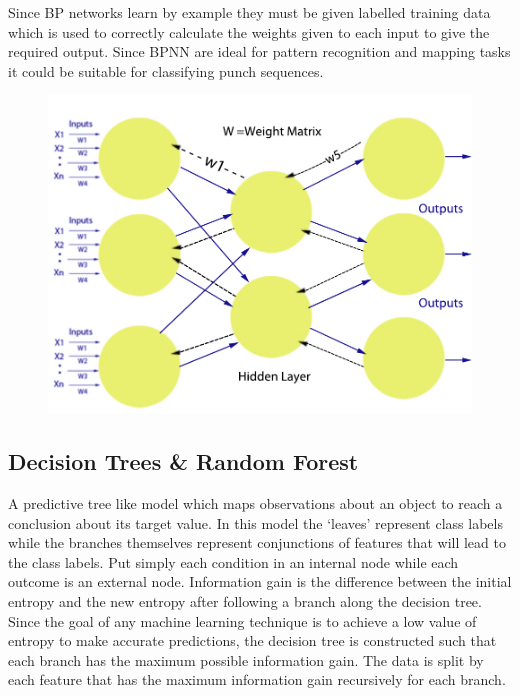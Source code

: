Since BP networks learn by example they must be given labelled training data which is used to correctly calculate the weights given to each input to give the required output. Since BPNN are ideal for pattern recognition and mapping tasks it could be suitable for classifying punch sequences.

\begin{figure}[h]
    \centering
    \includegraphics[height=0.25\textheight]{fig02/nn.pdf}
    \label{fig:kinect}
\end{figure}


\subsection{Decision Trees \& Random Forest}
A predictive tree like model which maps observations about an object to reach a conclusion about its target value. In this model the `leaves' represent class labels while the branches themselves represent conjunctions of features that will lead to the class labels. Put simply each condition in an internal node while each outcome is an external node. Information gain is the difference between the initial entropy and the new entropy after following a branch along the decision tree. Since the goal of any machine learning technique is to achieve a low value of entropy to make accurate predictions, the decision tree is constructed such that each branch has the maximum possible information gain. The data is split by each feature that has the maximum information gain recursively for each branch.

